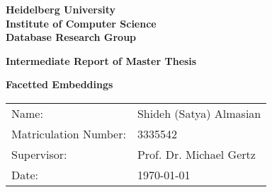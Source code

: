 \begin{titlepage}
  
\vspace*{1cm}
\begin{center}
\vspace*{3cm}
\textbf{ 
\Large Heidelberg University\\
\smallskip
\Large Institute of Computer Science \\
\smallskip
\Large Database Research Group\\
\smallskip
}

\vspace{3cm}

\textbf{\large Intermediate Report of Master Thesis } %

\vspace{0.5\baselineskip}
{\huge
\textbf{Facetted Embeddings}
}
\end{center}

\vfill 

{\large
\begin{tabular}[l]{ll}
Name: & Shideh (Satya) Almasian \\
Matriculation Number: & 3335542\\
Supervisor: & Prof. Dr. Michael Gertz\\
Date: & \today
\end{tabular}
}

\end{titlepage}

\newpage
\null
\thispagestyle{empty}
\newpage
